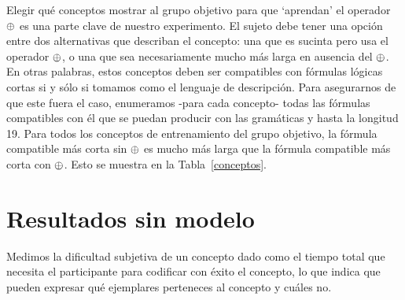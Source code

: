 Elegir qué conceptos mostrar al grupo objetivo para que `aprendan' el operador $\oplus$ es una parte clave de nuestro experimento. El sujeto debe tener una opción entre dos alternativas que describan el concepto: una que es sucinta pero usa el operador $\oplus$, o una que sea necesariamente mucho más larga en ausencia del $\oplus$. En otras palabras, estos conceptos deben ser compatibles con fórmulas lógicas cortas si y sólo si tomamos \gramboolxor como el lenguaje de descripción. Para asegurarnos de que este fuera el caso, enumeramos -para cada concepto- todas las fórmulas compatibles con él que se puedan producir con las gramáticas \grambool y \gramboolxor hasta la longitud 19. Para todos los conceptos de entrenamiento del grupo objetivo, la fórmula compatible más corta sin $\oplus$ es mucho más larga que la fórmula compatible más corta con $\oplus$. Esto se muestra en la Tabla~\ref{conceptos}.

\section{Resultados sin modelo}


Medimos la dificultad subjetiva de un concepto dado como el tiempo total que necesita el participante para codificar con éxito el concepto, lo que indica que pueden expresar qué ejemplares perteneces al concepto y cuáles no.



